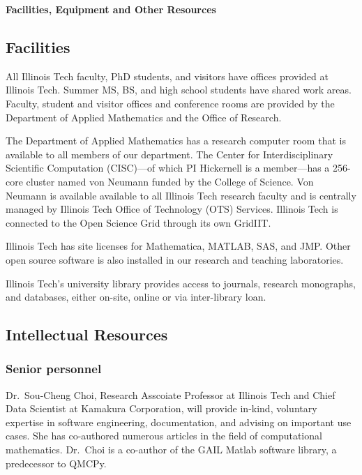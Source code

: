 \documentclass[11pt]{NSFamsart}
\begin{document}

\centerline{\textbf{\Large Facilities, Equipment and Other Resources}}

\bigskip

\subsection*{Facilities}
All Illinois Tech faculty, PhD students, and visitors have offices provided at Illinois Tech.  Summer 
MS, BS, and high school students have shared work areas.  Faculty, student and visitor 
offices and conference rooms are provided by the Department of Applied Mathematics and the Office of Research.

The Department of Applied Mathematics has a research computer room that is available to all 
members of our department.  The Center for Interdisciplinary Scientific Computation (CISC)---of which PI Hickernell is a member---has a 256-core cluster named von Neumann funded by the 
College of Science.  Von Neumann is 
available available to all Illinois Tech research faculty and is
centrally managed by Illinois Tech Office of Technology (OTS) Services.  Illinois Tech is connected 
to the Open Science Grid through its own GridIIT.  

Illinois Tech has site licenses for Mathematica, MATLAB, SAS, and JMP.  Other open source 
software is also installed in our research and teaching laboratories.

Illinois Tech's university library provides access to journals, research monographs, and 
databases, either on-site, online or via inter-library loan.

\subsection*{Intellectual Resources}
\phantom{a}

\subsubsection*{Senior personnel}  
Dr.\ Sou-Cheng Choi, Research Asscoiate Professor at Illinois Tech and Chief Data Scientist at Kamakura Corporation, will provide in-kind, voluntary expertise in software engineering, documentation, and advising on important use cases.  She has co-authored numerous articles in the field of computational mathematics.  Dr.\ Choi is a co-author of the GAIL Matlab software library, a predecessor to QMCPy.
\end{document}
